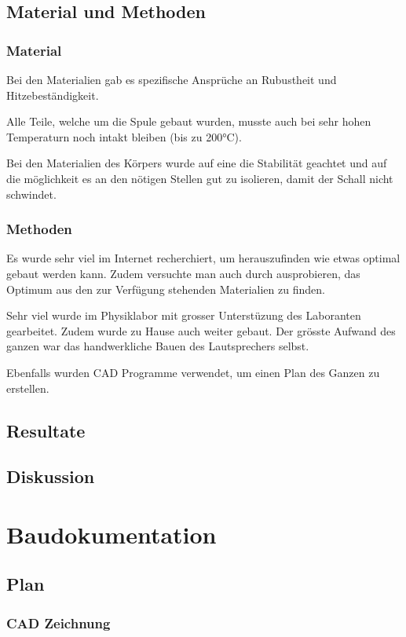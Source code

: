 \documentclass[a4paper,11pt]{report}
\begin{document}
\chapter{Material und Methoden}
\section{Material}
Bei den Materialien gab es spezifische Ansprüche an Rubustheit und Hitzebeständigkeit.

Alle Teile, welche um die Spule gebaut wurden, musste auch bei sehr hohen Temperaturn noch intakt bleiben (bis zu 200°C).

Bei den Materialien des Körpers wurde auf eine die Stabilität geachtet und auf die möglichkeit es an den nötigen Stellen gut zu isolieren, damit der Schall nicht schwindet.
\section{Methoden}
Es wurde sehr viel im Internet recherchiert, um herauszufinden wie etwas optimal gebaut werden kann. Zudem versuchte man auch durch ausprobieren, das Optimum aus den zur Verfügung stehenden Materialien zu finden.

Sehr viel wurde im Physiklabor mit grosser Unterstüzung des Laboranten gearbeitet. Zudem wurde zu Hause auch weiter gebaut. Der grösste Aufwand des ganzen war das handwerkliche Bauen des Lautsprechers selbst.

Ebenfalls wurden CAD Programme verwendet, um einen Plan des Ganzen zu erstellen.
\chapter{Resultate}
\chapter{Diskussion}

\part{Baudokumentation}

\chapter{Plan}
\section{CAD Zeichnung}
\end{document}
